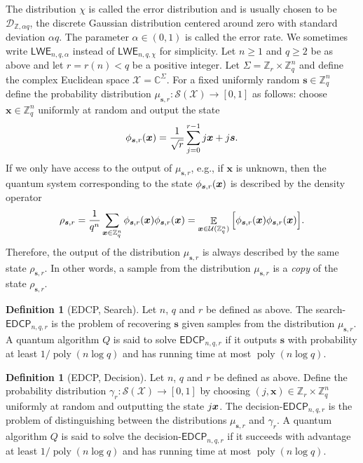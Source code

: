 \documentclass[11pt]{article}
\theoremstyle{plain}
\theoremstyle{definition}
\newtheorem{definition}[theorem]{Definition}
\DeclareMathOperator{\poly}{poly}
\DeclareMathOperator{\E}{\mathbb{E}}
\let\ket\relax
\DeclarePairedDelimiter{\ket}{\lvert}{\rangle}
\let\bra\relax
\DeclarePairedDelimiter{\bra}{\langle}{\rvert}
\def\C{\mathbb{C}}
\def\Z{\mathbb{Z}}
\def\lwe{\mathsf{LWE}}
\def\edcp{\mathsf{EDCP}}
\def\X{\mathcal{X}}
\def\SX{\mathcal{S(X)}}
\def\U{\mathcal{U}}
\begin{document}
The distribution $\chi$ is called the error distribution and is usually chosen to be $\mathcal{D}_{\Z, \alpha q}$, the discrete Gaussian distribution centered around zero with standard deviation $\alpha q$. The parameter $\alpha \in (0, 1)$ is called the error rate. We sometimes write $\lwe_{n, q, \alpha}$ instead of $\lwe_{n, q, \chi}$ for simplicity. Let $n \ge 1$ and $q \ge 2$ be as above and let $r = r(n) < q$ be a positive integer. Let $\Sigma = \Z_r \times \Z_q^n$ and define the complex Euclidean space $\X = \C^\Sigma$. For a fixed uniformly random $\bm{s} \in \Z_q^n$ define the probability distribution $\mu_{\bm{s}, r}: \SX \rightarrow [0, 1]$ as follows: choose $\bm{x} \in \Z_q^n$ uniformly at random and output the state
\[ \ket{\phi_{\bm{s}, r}(\bm{x})} = \frac{1}{\sqrt{r}} \sum_{j = 0}^{r - 1}\ket{j}\ket{\bm{x} + j\bm{s}}. \]
If we only have access to the output of $\mu_{\bm{s}, r}$, e.g., if $\bm{x}$ is unknown, then the quantum system corresponding to the state $\ket{\phi_{\bm{s}, r}(\bm{x})}$ is described by the density operator
\[ \rho_{\bm{s}, r} = \frac{1}{q^n} \sum_{\bm{x} \in \Z_q^n} \ket{\phi_{\bm{s}, r}(\bm{x})} \bra{\phi_{\bm{s}, r}(\bm{x})} = \E_{\bm{x} \in \U(\Z_q^n)} \Big[ \ket{\phi_{\bm{s}, r}(\bm{x})} \bra{\phi_{\bm{s}, r}(\bm{x})} \Big]. \]
Therefore, the output of the distribution $\mu_{\bm{s}, r}$ is always described by the same state $\rho_{\bm{s}, r}$. In other words, a sample from the distribution $\mu_{\bm{s}, r}$ is a \textit{copy} of the state $\rho_{\bm{s}, r}$.

\begin{definition}[EDCP, Search]
    Let $n$, $q$ and $r$ be defined as above. The search-$\edcp_{n, q, r}$ is the problem of recovering $\bm{s}$ given samples from the distribution $\mu_{\bm{s}, r}$. A quantum algorithm $Q$ is said to solve $\edcp_{n, q, r}$ if it outputs $\bm{s}$ with probability at least $1 / \poly(n\log q)$ and has running time at most $\poly(n\log q)$.
\end{definition}

\begin{definition}[EDCP, Decision]
    \label{def:d-edcp}
    Let $n$, $q$ and $r$ be defined as above. Define the probability distribution $\gamma_r: \SX \rightarrow [0, 1]$ by choosing $(j, \bm{x}) \in \Z_r \times \Z_q^n$ uniformly at random and outputting the state $\ket{j}\ket{\bm{x}}$. The decision-$\edcp_{n, q, r}$ is the problem of distinguishing between the distributions $\mu_{\bm{s}, r}$ and $\gamma_r$. A quantum algorithm $Q$ is said to solve the decision-$\edcp_{n, q, r}$ if it succeeds with advantage at least $1 / \poly(n\log q)$ and has running time at most $\poly(n\log q)$.
\end{definition}
\end{document}
